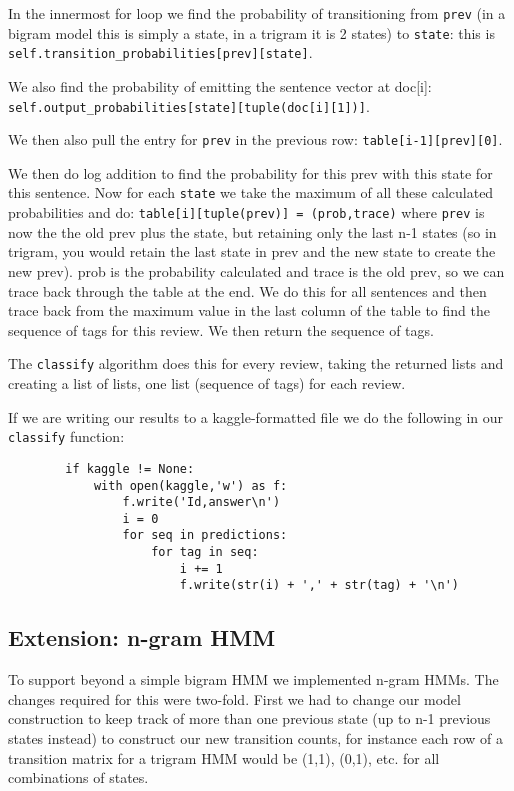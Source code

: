 \documentclass{article}
\begin{document}
In the innermost for loop we find the probability of transitioning from \texttt{prev} (in a bigram model this is simply a state, in a trigram it is 2 states) to \texttt{state}: this is \texttt{self.transition\_probabilities[prev][state]}.\par
We also find the probability of emitting the sentence vector at doc[i]:\\
\texttt{self.output\_probabilities[state][tuple(doc[i][1])]}.\par

We then also pull the entry for \texttt{prev} in the previous row: \texttt{table[i-1][prev][0]}.\par

We then do log addition to find the probability for this prev with this state for this sentence. Now for each \texttt{state} we take the maximum of all these calculated probabilities and do: \texttt{table[i][tuple(prev)] = (prob,trace)} where \texttt{prev} is now the the old prev plus the state, but retaining only the last n-1 states (so in trigram, you would retain the last state in prev and the new state to create the new prev). prob is the probability calculated and trace is the old prev, so we can trace back through the table at the end. We do this for all sentences and then trace back from the maximum value in the last column of the table to find the sequence of tags for this review. We then return the sequence of tags. 

The \texttt{classify} algorithm does this for every review, taking the returned lists and creating a list of lists, one list (sequence of tags) for each review. 

If we are writing our results to a kaggle-formatted file we do the following in our \texttt{classify} function: 
\begin{verbatim}
        if kaggle != None:
            with open(kaggle,'w') as f:
                f.write('Id,answer\n')
                i = 0
                for seq in predictions:
                    for tag in seq:
                        i += 1
                        f.write(str(i) + ',' + str(tag) + '\n')
\end{verbatim}

\subsection{Extension: n-gram HMM}

To support beyond a simple bigram HMM we implemented n-gram HMMs. The changes required for this were two-fold. First we had to change our model construction to keep track of more than one previous state (up to n-1 previous states instead) to construct our new transition counts, for instance each row of a transition matrix for a trigram HMM would be (1,1), (0,1), etc. for all combinations of states. 
\end{document}
